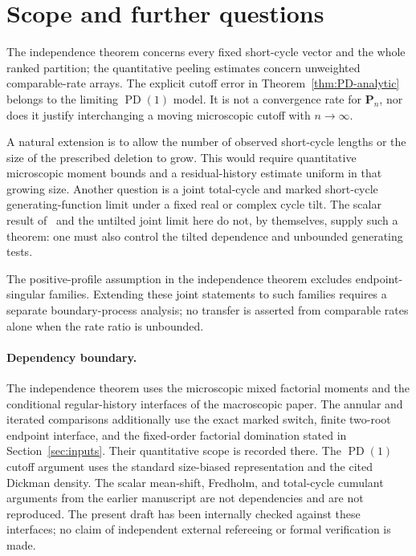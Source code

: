 \documentclass[11pt]{article}
\numberwithin{equation}{section}
\newcommand{\PD}{\operatorname{PD}}
\theoremstyle{definition}
\theoremstyle{remark}
\begin{document}
\section{Scope and further questions}\label{sec:open}

The independence theorem concerns every fixed short-cycle vector and the
whole ranked partition; the quantitative peeling estimates concern
unweighted comparable-rate arrays.  The explicit cutoff error in
Theorem~\ref{thm:PD-analytic} belongs to the limiting $\PD(1)$ model.
It is not a convergence rate for $\mathbf P_n$, nor does it justify
interchanging a moving microscopic cutoff with $n\to\infty$.

A natural extension is to allow the number of observed short-cycle lengths
or the size of the prescribed deletion to grow.  This would require
quantitative microscopic moment bounds and a residual-history estimate
uniform in that growing size.  Another question is a joint total-cycle
and marked short-cycle generating-function limit under a fixed real or
complex cycle tilt.  The scalar result of~\cite{LongModPoisson2026} and
the untilted joint limit here do not, by themselves, supply such a theorem:
one must also control the tilted dependence and unbounded generating tests.

The positive-profile assumption in the independence theorem excludes
endpoint-singular families.  Extending these joint statements to such
families requires a separate boundary-process analysis; no transfer is
asserted from comparable rates alone when the rate ratio is unbounded.

\paragraph{Dependency boundary.}
The independence theorem uses the microscopic mixed factorial moments and
the conditional regular-history interfaces of the macroscopic paper.
The annular and iterated comparisons additionally use the exact marked
switch, finite two-root endpoint interface, and the fixed-order factorial
domination stated in Section~\ref{sec:inputs}.  Their quantitative scope is
recorded there.  The $\PD(1)$ cutoff argument uses the standard size-biased
representation and the cited Dickman density.  The scalar mean-shift,
Fredholm, and total-cycle cumulant arguments from the earlier manuscript
are not dependencies and are not reproduced.  The present draft has been
internally checked against these interfaces; no claim of independent
external refereeing or formal verification is made.
\end{document}
